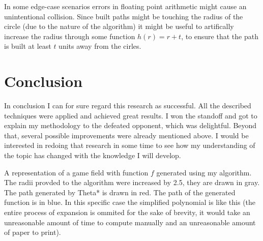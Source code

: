 \documentclass[12pt, titlepage]{article}
\begin{document}
In some edge-case scenarios errors in floating point arithmetic might 
cause an unintentional collision. Since built paths might be touching 
the radius of the circle (due to the nature of the algorithm) it might be
useful to artifically increase the radius through some function $h(r) = r + t$,
to ensure that the path is built at least $t$ units away from the cirles.

\section{Conclusion}
In conclusion I can for sure regard this research as successful. All the
described techniques were applied and achieved great results. I won the
standoff and got to explain my methodology to the defeated opponent, which
was delightful. Beyond that, several possible improvements were already 
mentioned above. I would be interested in redoing that research in some time
to see how my understanding of the topic has changed with the knowledge I will
develop.

\begin{center}
\end{center}
A representation of a game field with function $f$ generated using my
algorithm. The radii provded to the algorithm were increased by 2.5,
they are drawn in gray. The path generated by Theta* is drawn in red.
The path of the generated function is in blue. In this specific case
the simplified polynomial is like this (the entire process of expansion
is ommited for the sake of brevity, it  would take an unreasonable amount 
of time to compute manually and an unreasonable amount of paper to print).
\end{document}
